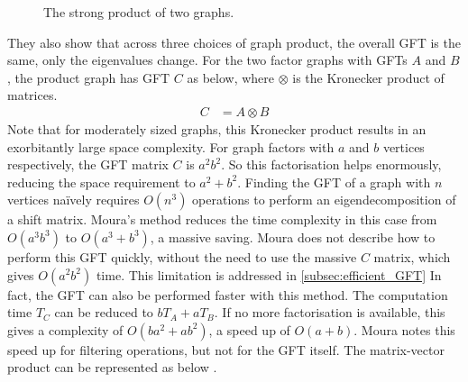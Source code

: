 \documentclass[12pt,a4paper]{article} %
\begin{document}
\begin{figure}[!ht]
    \caption{The strong product of two graphs.}
    \label{fig:strong_product}
\end{figure}
They also show that across three choices of graph product, the overall GFT is the same, only the eigenvalues change. For the two factor graphs with GFTs $A$ and $B$, the product graph has GFT $C$ as below, where $\otimes$ is the Kronecker product of matrices.
\begin{align*}
    C&=A\otimes B
\end{align*}
Note that for moderately sized graphs, this Kronecker product results in an exorbitantly large space complexity. For graph factors with $a$ and $b$ vertices respectively, the GFT matrix $C$ is $a^2b^2$. So this factorisation helps enormously, reducing the space requirement to $a^2+b^2$. Finding the GFT of a graph with $n$ vertices na\"{i}vely requires $O(n^3)$ operations to perform an eigendecomposition of a shift matrix. Moura's method reduces the time complexity in this case from $O(a^3b^3)$ to $O(a^3+b^3)$, a massive saving. Moura does not describe how to perform this GFT quickly, without the need to use the massive $C$ matrix, which gives $O(a^2b^2)$ time. This limitation is addressed in \ref{subsec:efficient_GFT} In fact, the GFT can also be performed faster with this method. The computation time $T_C$ can be reduced to $bT_A+aT_B$. If no more factorisation is available, this gives a complexity of $O(ba^2+ab^2)$, a speed up of $O(a+b)$. Moura notes this speed up for filtering operations, but not for the GFT itself. The matrix-vector product can be represented as below \cite{loan}.
\end{document}
